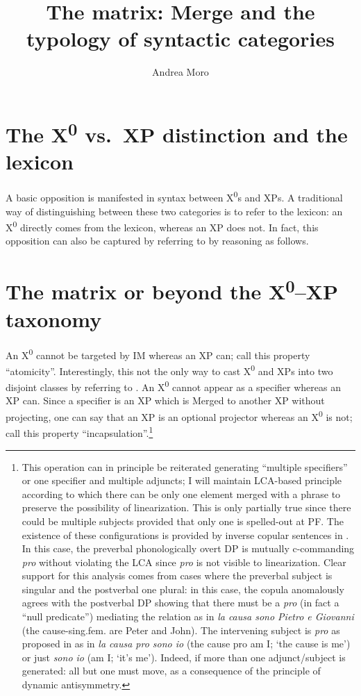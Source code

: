 \documentclass[output=paper]{langsci/langscibook}
\author{Andrea Moro\affiliation{University School for Advanced Studies IUSS, Pavia}}
\title{The matrix: Merge and the typology of syntactic categories}
\begin{document}
\glsresetall

\section{The X\textsuperscript{0} vs.\ XP distinction and the lexicon}

A basic opposition is manifested in syntax between X\textsuperscript{0}s and
XPs. A traditional way of distinguishing between these two categories is to
refer to the lexicon: an X\textsuperscript{0} directly comes from the lexicon,
whereas an XP does not. In fact, this opposition can also be captured by
referring to  by reasoning as follows.\largerpage[-1]

\section{The matrix or beyond the X\textsuperscript{0}--XP taxonomy}

An X\textsuperscript{0} cannot be targeted by \gls{IM} whereas an XP can; call
this property “atomicity”. Interestingly, this not the only way to cast
X\textsuperscript{0} and XPs into two disjoint classes by referring to
.  An X\textsuperscript{0} cannot appear as a specifier whereas an
XP can.  Since a specifier is an XP which is Merged to another XP without
projecting, one can say that an XP is an optional projector whereas an
X\textsuperscript{0} is not; call this property “incapsulation”.\footnote{This
    operation can in principle be reiterated generating “multiple specifiers”
    or one specifier and multiple adjuncts; I will maintain 
    \gls{LCA}-based principle according to which there can be
    only one element merged with a phrase to preserve the possibility of
    linearization. This is only partially true since there could be multiple
    subjects provided that only one is spelled-out at \gls{PF}. The existence
    of these configurations is provided by inverse copular sentences
    in . In this case, the preverbal phonologically overt DP is mutually
    c-commanding \emph{pro} without violating the \gls{LCA} since \emph{pro} is
    not visible to linearization. Clear support for this analysis comes from
    cases where the preverbal subject is singular and the postverbal one
    plural: in this case, the copula anomalously agrees with the postverbal DP
    showing that there must be a \emph{pro} (in fact a “null predicate”)
    mediating the  relation as in \emph{la causa sono Pietro e
    Giovanni} (the cause-sing.fem.  are Peter and John). The intervening
    subject is \emph{pro} as proposed in \citet{Moro1997} as in \emph{la causa
    pro sono io} (the cause pro am I; `the cause is me') or just \emph{sono io}
    (am I; `it's me'). Indeed, if more than one adjunct\slash subject is generated:
all but one must move, as a consequence of the principle of dynamic
antisymmetry.}
\end{document}

